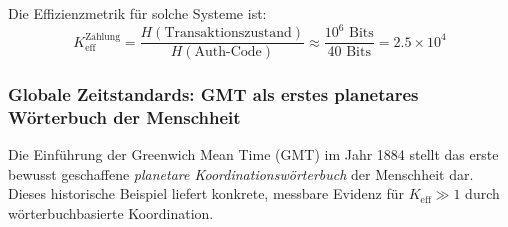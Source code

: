 \documentclass[11pt,a4paper]{article}
\begin{document}
	Die Effizienzmetrik für solche Systeme ist:
	\begin{equation}
		K_{\mathrm{eff}}^{\text{Zahlung}} = \frac{H(\text{Transaktionszustand})}{H(\text{Auth-Code})} \approx \frac{10^6 \text{ Bits}}{40 \text{ Bits}} = 2.5 \times 10^4
	\end{equation}
	
	\subsubsection{Globale Zeitstandards: GMT als erstes planetares Wörterbuch der Menschheit}
	\label{subsec:gmt-dictionary}
	
	Die Einführung der Greenwich Mean Time (GMT) im Jahr 1884 stellt das erste bewusst geschaffene \textit{planetare Koordinationswörterbuch} der Menschheit dar. Dieses historische Beispiel liefert konkrete, messbare Evidenz für $K_{\mathrm{eff}} \gg 1$ durch wörterbuchbasierte Koordination.
	
\end{document}
